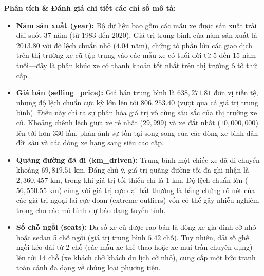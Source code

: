 \begin{table}[H]
    \centering
    \caption{Thống kê mô tả các đặc trưng số của bộ dữ liệu Used Car}
    \label{tab:used_car_describe}
\end{table}

\textbf{Phân tích \& Đánh giá chi tiết các chỉ số mô tả:}
\begin{itemize}
    \item \textbf{Năm sản xuất (year):} Bộ dữ liệu bao gồm các mẫu xe được sản xuất trải dài suốt 37 năm (từ 1983 đến 2020). Giá trị trung bình của năm sản xuất là $2013.80$ với độ lệch chuẩn nhỏ ($4.04$ năm), chứng tỏ phần lớn các giao dịch trên thị trường xe cũ tập trung vào các mẫu xe có tuổi đời từ 5 đến 15 năm tuổi—đây là phân khúc xe có thanh khoản tốt nhất trên thị trường ô tô thứ cấp.
    \item \textbf{Giá bán (selling\_price):} Giá bán trung bình là $638,271.81$ đơn vị tiền tệ, nhưng độ lệch chuẩn cực kỳ lớn lên tới $806,253.40$ (vượt qua cả giá trị trung bình). Điều này chỉ ra sự phân hóa giá trị vô cùng sâu sắc của thị trường xe cũ. Khoảng chênh lệch giữa xe rẻ nhất ($29,999$) và xe đắt nhất ($10,000,000$) lên tới hơn $330$ lần, phản ánh sự tồn tại song song của các dòng xe bình dân đời sâu và các dòng xe hạng sang siêu cao cấp.
    \item \textbf{Quãng đường đã đi (km\_driven):} Trung bình một chiếc xe đã di chuyển khoảng $69,819.51$ km. Đáng chú ý, giá trị quãng đường tối đa ghi nhận là $2,360,457$ km, trong khi giá trị tối thiểu chỉ là $1$ km. Độ lệch chuẩn lớn ($56,550.55$ km) cùng với giá trị cực đại bất thường là bằng chứng rõ nét của các giá trị ngoại lai cực đoan (extreme outliers) vốn có thể gây nhiễu nghiêm trọng cho các mô hình dự báo dạng tuyến tính.
    \item \textbf{Số chỗ ngồi (seats):} Đa số xe cũ được rao bán là dòng xe gia đình cỡ nhỏ hoặc sedan 5 chỗ ngồi (giá trị trung bình $5.42$ chỗ). Tuy nhiên, dải số ghế ngồi kéo dài từ 2 chỗ (các mẫu xe thể thao hoặc xe mui trần chuyên dụng) lên tới 14 chỗ (xe khách chở khách du lịch cỡ nhỏ), cung cấp một bức tranh toàn cảnh đa dạng về chủng loại phương tiện.
\end{itemize}

